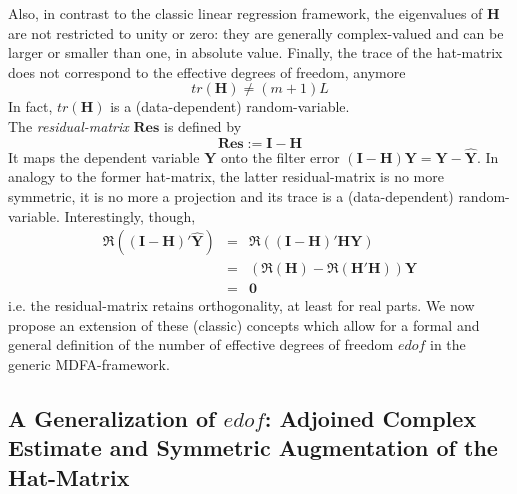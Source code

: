 \documentclass[a4paper]{book}
\begin{document}
Also, in contrast to the classic linear regression framework, the eigenvalues of $\mathbf{H}$ are not restricted to unity or zero: they are generally complex-valued and can be larger or smaller than one, in absolute value. Finally, the trace of the hat-matrix does not correspond to the effective degrees of freedom, anymore
\[tr(\mathbf{H})\neq (m+1)L\]
In fact, $tr(\mathbf{H})$ is a (data-dependent) random-variable. \\

The \emph{residual-matrix} $\mathbf{Res}$ is defined by
\[\mathbf{Res:=I-H}\]
It maps the dependent variable $\mathbf{Y}$ onto the filter error $\mathbf{(I-H)Y}=\mathbf{Y}-\hat{\mathbf{Y}}$. In analogy to the former hat-matrix, the latter residual-matrix  is no more symmetric, it is no more a projection and its trace is a (data-dependent) random-variable. Interestingly, though, 
\begin{eqnarray*}
\Re\left(\mathbf{(I-H)'\hat{Y}}\right)&=&\Re\left(\mathbf{(I-H)'HY}\right)\\
&=&\left(\Re(\mathbf{H})-\Re(\mathbf{H'H})\right)\mathbf{Y}\\
&=&\mathbf{0}
\end{eqnarray*}
i.e. the residual-matrix retains orthogonality, at least for real parts. 
We now propose an extension of these (classic) concepts which allow for a formal and general definition of the number of effective degrees of freedom $edof$ in the generic MDFA-framework. 




\subsection{A Generalization of $edof$: Adjoined Complex Estimate and Symmetric Augmentation of the Hat-Matrix}
\end{document}
